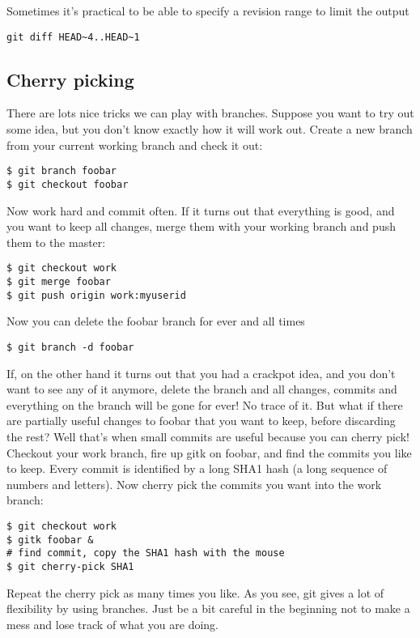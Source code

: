 \documentclass[a4paper,10pt]{article}
\begin{document}
Sometimes it's practical to be able to specify a revision range to limit the
output
\begin{verbatim}
git diff HEAD~4..HEAD~1
\end{verbatim}

\subsection{Cherry picking}
\label{sec:cherry}
There are lots nice tricks we can play with
branches. Suppose you want to try out some idea, but you don't know exactly
how it will work out. Create a new branch from your current working branch and
check it out:
\begin{verbatim}
$ git branch foobar
$ git checkout foobar
\end{verbatim}
Now work hard and commit often. If it turns out that everything is good, and
you want to keep all changes, merge them with your working branch and push
them to the master:
\begin{verbatim}
$ git checkout work
$ git merge foobar
$ git push origin work:myuserid
\end{verbatim}
Now you can delete the foobar branch for ever and all times
\begin{verbatim}
$ git branch -d foobar
\end{verbatim}
If, on the other hand it turns out that you had a crackpot idea, and you
don't want to see any of it anymore, delete the branch and all changes,
commits and everything on the branch will be gone for ever! No trace of it.
But what if there are partially useful changes to foobar that you want to
keep, before discarding the rest? Well that's when small commits are useful
because you can cherry pick! Checkout your work branch, fire up gitk on foobar,
and find the commits you like to keep. Every commit is identified by a long
SHA1 hash (a long sequence of numbers and letters). Now cherry pick the
commits you want into the work branch:
\begin{verbatim}
$ git checkout work
$ gitk foobar &
# find commit, copy the SHA1 hash with the mouse
$ git cherry-pick SHA1
\end{verbatim}
Repeat the cherry pick as many times you like. As you see, git gives a lot of
flexibility by using branches. Just be a bit careful in the beginning not to
make a mess and lose track of what you are doing. 
\end{document}

